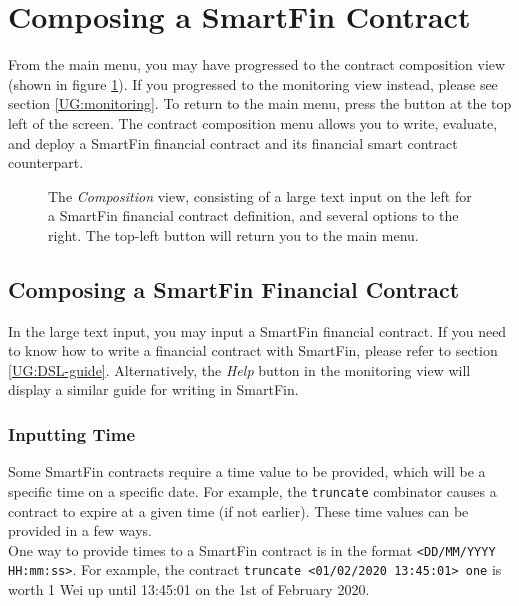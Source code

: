 \documentclass{article}
\begin{document}
\section{Composing a SmartFin Contract} \label{UG:composition}

From the main menu, you may have progressed to the contract composition view (shown in figure \ref{UG:fig:composition}). If you progressed to the monitoring view instead, please see section \ref{UG:monitoring}. To return to the main menu, press the button at the top left of the screen. The contract composition menu allows you to write, evaluate, and deploy a SmartFin financial contract and its financial smart contract counterpart.

\begin{figure}[h]
    \centering
    \caption{The \textit{Composition} view, consisting of a large text input on the left for a SmartFin financial contract definition, and several options to the right. The top-left button will return you to the main menu.}
    \label{UG:fig:composition}
\end{figure}

\subsection{Composing a SmartFin Financial Contract}

In the large text input, you may input a SmartFin financial contract. If you need to know how to write a financial contract with SmartFin, please refer to section \ref{UG:DSL-guide}. Alternatively, the \textit{Help} button in the monitoring view will display a similar guide for writing in SmartFin.


\subsubsection{Inputting Time} \label{UG:time-input}

Some SmartFin contracts require a time value to be provided, which will be a specific time on a specific date. For example, the \texttt{truncate} combinator causes a contract to expire at a given time (if not earlier). These time values can be provided in a few ways. \\

One way to provide times to a SmartFin contract is in the format \texttt{<DD/MM/YYYY HH:mm:ss>}. For example, the contract \texttt{truncate <01/02/2020 13:45:01> one} is worth 1 Wei up until 13:45:01 on the 1st of February 2020.
\end{document}
